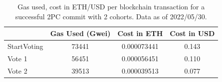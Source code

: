 \documentclass[11pt,conference]{IEEEtran}
\begin{document}
\appendix
\label{appendix}
\begin{table}[hbtp]
  \centering
  \caption{Gas used, cost in ETH/USD per blockchain transaction for a successful 2PC commit with 2 cohorts. Data as of 2022/05/30.}
  \label{table:cost}
  \begin{tabular}{|l|c|c|c|}
    \hline
          & Gas Used (Gwei) &  Cost in ETH & Cost in USD \\
          \hline
    StartVoting &73441 &0.000073441 & 0.143\\
    \hline
    Vote 1 &56451	&0.000056451 &0.110\\
    \hline
    Vote 2 &39513 &0.000039513 &0.077\\
    \hline
  \end{tabular}
\end{table}
\end{document}
